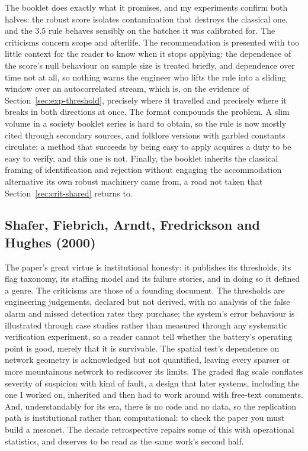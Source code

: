The booklet does exactly what it promises, and my experiments confirm both
halves: the robust score isolates contamination that destroys the classical
one, and the 3.5 rule behaves sensibly on the batches it was calibrated for.
The criticisms concern scope and afterlife. The recommendation is presented
with too little context for the reader to know when it stops applying: the
dependence of the score's null behaviour on sample size is treated briefly,
and dependence over time not at all, so nothing warns the engineer who
lifts the rule into a sliding window over an autocorrelated stream, which
is, on the evidence of Section~\ref{sec:exp-threshold}, precisely where it
travelled and precisely where it breaks in both directions at once. The
format compounds the problem. A slim volume in a society booklet series is
hard to obtain, so the rule is now mostly cited through secondary sources,
and folklore versions with garbled constants circulate; a method that
succeeds by being easy to apply acquires a duty to be easy to verify, and
this one is not. Finally, the booklet inherits the classical framing of
identification and rejection without engaging the accommodation alternative
its own robust machinery came from, a road not taken that
Section~\ref{sec:crit-shared} returns to.

\subsection{Shafer, Fiebrich, Arndt, Fredrickson and Hughes (2000)}

The paper's great virtue is institutional honesty: it publishes its
thresholds, its flag taxonomy, its staffing model and its failure stories,
and in doing so it defined a genre. The criticisms are those of a founding
document. The thresholds are engineering judgements, declared but not
derived, with no analysis of the false alarm and missed detection rates they
purchase; the system's error behaviour is illustrated through case studies
rather than measured through any systematic verification experiment, so a
reader cannot tell whether the battery's operating point is good, merely
that it is survivable. The spatial test's dependence on network geometry is
acknowledged but not quantified, leaving every sparser or more mountainous
network to rediscover its limits. The graded flag scale conflates severity
of suspicion with kind of fault, a design that later systems, including the
one I worked on, inherited and then had to work around with free-text
comments. And, understandably for its era, there is no code and no data, so
the replication path is institutional rather than computational: to check
the paper you must build a mesonet. The decade retrospective
\citep{fiebrich2010} repairs some of this with operational statistics, and
deserves to be read as the same work's second half.

